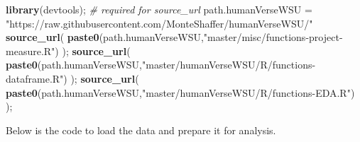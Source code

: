 \documentclass[]{article}
\newenvironment{Shaded}{\begin{snugshade}}{\end{snugshade}}
\newcommand{\CommentTok}[1]{\textcolor[rgb]{0.56,0.35,0.01}{\textit{#1}}}
\newcommand{\KeywordTok}[1]{\textcolor[rgb]{0.13,0.29,0.53}{\textbf{#1}}}
\newcommand{\NormalTok}[1]{#1}
\newcommand{\StringTok}[1]{\textcolor[rgb]{0.31,0.60,0.02}{#1}}
\begin{document}
\vskip -8.5pt




\noindent  

\begin{Shaded}
\begin{Highlighting}[]
\KeywordTok{library}\NormalTok{(devtools);       }\CommentTok{\# required for source\_url}
\NormalTok{path.humanVerseWSU =}\StringTok{ "https://raw.githubusercontent.com/MonteShaffer/humanVerseWSU/"}
\KeywordTok{source\_url}\NormalTok{( }\KeywordTok{paste0}\NormalTok{(path.humanVerseWSU,}\StringTok{"master/misc/functions{-}project{-}measure.R"}\NormalTok{) );}
\KeywordTok{source\_url}\NormalTok{( }\KeywordTok{paste0}\NormalTok{(path.humanVerseWSU,}\StringTok{"master/humanVerseWSU/R/functions{-}dataframe.R"}\NormalTok{) );}
\KeywordTok{source\_url}\NormalTok{( }\KeywordTok{paste0}\NormalTok{(path.humanVerseWSU,}\StringTok{"master/humanVerseWSU/R/functions{-}EDA.R"}\NormalTok{) );}
\end{Highlighting}
\end{Shaded}

Below is the code to load the data and prepare it for analysis.
\end{document}
